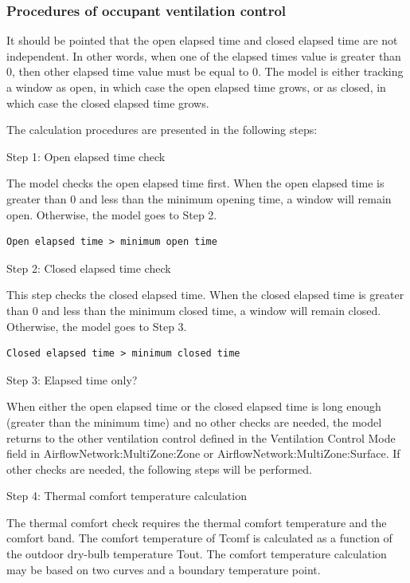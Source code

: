 \subsubsection{Procedures of occupant ventilation control}\label{procedures-of-occupant-ventilation-control}

It should be pointed that the open elapsed time and closed elapsed time are not independent. In other words, when one of the elapsed times value is greater than 0, then other elapsed time value must be equal to 0. The model is either tracking a window as open, in which case the open elapsed time grows, or as closed, in which case the closed elapsed time grows.

The calculation procedures are presented in the following steps:

Step 1: Open elapsed time check

The model checks the open elapsed time first. When the open elapsed time is greater than 0 and less than the minimum opening time, a window will remain open. Otherwise, the model goes to Step 2.

\begin{lstlisting}
Open elapsed time > minimum open time
\end{lstlisting}

Step 2: Closed elapsed time check

This step checks the closed elapsed time. When the closed elapsed time is greater than 0 and less than the minimum closed time, a window will remain closed. Otherwise, the model goes to Step 3.

\begin{lstlisting}
Closed elapsed time > minimum closed time
\end{lstlisting}

Step 3: Elapsed time only?

When either the open elapsed time or the closed elapsed time is long enough (greater than the minimum time) and no other checks are needed, the model returns to the other ventilation control defined in the Ventilation Control Mode field in AirflowNetwork:MultiZone:Zone or AirflowNetwork:MultiZone:Surface. If other checks are needed, the following steps will be performed.

Step 4: Thermal comfort temperature calculation

The thermal comfort check requires the thermal comfort temperature and the comfort band. The comfort temperature of Tcomf is calculated as a function of the outdoor dry-bulb temperature Tout. The comfort temperature calculation may be based on two curves and a boundary temperature point.


